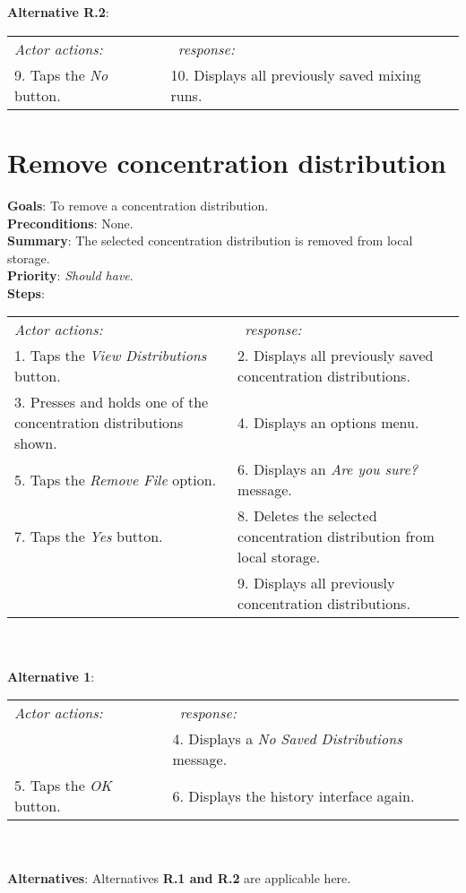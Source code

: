     \\
         \\\textbf{Alternative R.2}: \\
        \begin{tabular}{ p{} p{} }
  	\emph{Actor actions:} & \emph{\projectname\ response:} \\
    9. Taps the \emph{No} button. & 10. Displays all previously saved mixing runs. \\
    \end{tabular}
    
\section{Remove concentration distribution}
 \label{removedist}
  \textbf{Goals}: To remove a concentration distribution.\\
  \textbf{Preconditions}: None.\\
  \textbf{Summary}: The selected concentration distribution is removed from local storage.\\
  \textbf{Priority}: \emph{Should have}.\\
  \textbf{Steps}: \\
    \begin{tabular}{ p{} p{} }
  	\emph{Actor actions:} & \emph{\projectname\ response:} \\
    1. Taps the \emph{View Distributions} button. & 2. Displays all previously saved concentration distributions.\\
    3. Presses and holds one of the concentration distributions shown. & 4. Displays an options menu. \\
    5. Taps the \emph{Remove File} option. & 6. Displays an \emph{Are you sure?} message.\\
    7. Taps the \emph{Yes} button. & 8. Deletes the selected concentration distribution from local storage. \\
     & 9. Displays all previously concentration distributions.\\
    \end{tabular}
                \\
     \\\textbf{Alternative 1}: \\
    \begin{tabular}{ p{} p{} }
  	\emph{Actor actions:} & \emph{\projectname\ response:} \\
            & 4. Displays a \emph{No Saved Distributions} message. \\
    5. Taps the \emph{OK} button. & 6. Displays the history interface again. \\
    \end{tabular}
    \\
    \\\textbf{Alternatives}: Alternatives \textbf{R.1 and R.2} are applicable here.

